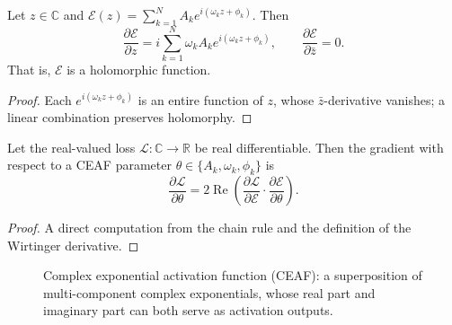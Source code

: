 \begin{proposition}\label{prop:ceaf_wirtinger}
Let $z\in\mathbb{C}$ and $\mathcal{E}(z) = \sum_{k=1}^{N}A_k e^{i(\omega_k z+\phi_k)}$. Then
\[
\frac{\partial\mathcal{E}}{\partial z} = i\sum_{k=1}^{N}\omega_k A_k e^{i(\omega_k z+\phi_k)}, \qquad
\frac{\partial\mathcal{E}}{\partial\bar z} = 0.
\]
That is, $\mathcal{E}$ is a holomorphic function.
\end{proposition}

\begin{proof}
Each $e^{i(\omega_k z+\phi_k)}$ is an entire function of $z$, whose $\bar z$-derivative vanishes; a linear combination preserves holomorphy.
\end{proof}

\begin{corollary}\label{cor:ceaf_gradient}
Let the real-valued loss $\mathcal{L}:\mathbb{C}\to\mathbb{R}$ be real differentiable. Then the gradient with respect to a CEAF parameter $\theta\in\{A_k,\omega_k,\phi_k\}$ is
\[
\frac{\partial\mathcal{L}}{\partial\theta} = 2\operatorname{Re}\left(\frac{\partial\mathcal{L}}{\partial\mathcal{E}}\cdot\frac{\partial\mathcal{E}}{\partial\theta}\right).
\]
\end{corollary}

\begin{proof}
A direct computation from the chain rule and the definition of the Wirtinger derivative.
\end{proof}

\begin{figure}[htbp]
\centering
{}
\caption{Complex exponential activation function (CEAF): a superposition of multi-component complex exponentials, whose real part and imaginary part can both serve as activation outputs.}
\label{fig:ps_ceaf}
\end{figure}

